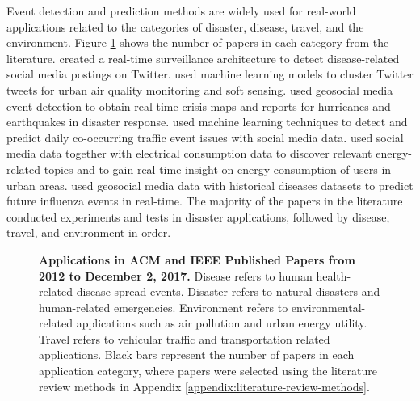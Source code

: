 Event detection and prediction methods are widely used for real-world applications related to the categories of disaster, disease, travel, and the environment. Figure \ref{figure:papers_applications} shows the number of papers in each category from the literature. \cite{Sofean:2012} created a real-time surveillance architecture to detect disease-related social media postings on Twitter. \cite{Riga:2014} used machine learning models to cluster Twitter tweets for urban air quality monitoring and soft sensing. \cite{Middleton:2014} used geosocial media event detection to obtain real-time crisis maps and reports for hurricanes and earthquakes in disaster response. \cite{Semwal:2015} used machine learning techniques to detect and predict daily co-occurring traffic event issues with social media data. \cite{Bodnar:2017} used social media data together with electrical consumption data to discover relevant energy-related topics and to gain real-time insight on energy consumption of users in urban areas. \cite{Lee:2017} used geosocial media data with historical diseases datasets to predict future influenza events in real-time. The majority of the papers in the literature conducted experiments and tests in disaster applications, followed by disease, travel, and environment in order.

\begin{figure}[!htb]
\begin{center}
\caption{\textbf{Applications in ACM and IEEE Published Papers from 2012 to December 2, 2017.} Disease refers to human health-related disease spread events. Disaster refers to natural disasters and human-related emergencies. Environment refers to environmental-related applications such as air pollution and urban energy utility. Travel refers to vehicular traffic and transportation related applications. Black bars represent the number of papers in each application category, where papers were selected using the literature review methods in Appendix \ref{appendix:literature-review-methods}.}
\label{figure:papers_applications}
\end{center}
\end{figure}


